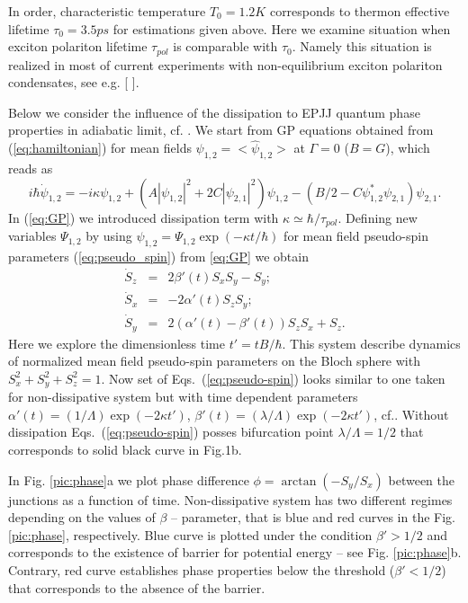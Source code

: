 \documentclass[aps, pre, preprint, groupedaddress, superscriptaddress, showkeys, showpacs] {revtex4-1}
\begin{document}
In order,  characteristic  temperature $T_{0}=1.2K$ corresponds to thermon effective lifetime  $\tau_{0}=3.5ps$ for estimations given above. Here we examine situation when exciton polariton lifetime $\tau_{pol}$ is comparable with $\tau_{0}$. Namely  this situation is realized in most of current experiments with non-equilibrium exciton polariton condensates, see e.g. [   ].  

Below we consider the influence of the dissipation to  EPJJ quantum phase properties in adiabatic limit, cf. \cite{Sols}.
We start from GP equations obtained from  (\ref{eq:hamiltonian}) for mean fields $\psi_{1,2}=<\hat\psi_{1,2}>$  at $\Gamma = 0$ ($B = G$),  which reads as 
\begin{equation}
i \hbar \dot{\psi}_{1,2} = -i \kappa \psi_{1,2} + (A|\psi_{1,2}|^2 + 2C |\psi_{2,1}|^2) \psi_{1,2} - (B/2 - C \psi_{1,2}^* \psi_{2,1}) \psi_{2,1}. 
\label{eq:GP}
\end{equation}
In (\ref{eq:GP}) we introduced dissipation  term with $\kappa \simeq \hbar/\tau_{pol}$.
Defining new variables $\Psi_{1,2}$ by using  $\psi_{1,2} = \Psi_{1,2} \exp(-\kappa t / \hbar)$ for mean field pseudo-spin  parameters (\eqref{eq:pseudo_spin}) from {\ref{eq:GP}} we obtain
%
%
% 
\begin{equation}
\begin{array}{lcl}
\dot{S}_z & = &  2 \beta'(t) S_x S_y - S_y; \\
\dot{S}_x & = & -2 \alpha'(t) S_z S_y; \\
\dot{S}_y & = & 2(\alpha'(t) - \beta'(t)) S_z S_x + S_z.
\end{array}
\label{eq:pseudo-spin}
\end{equation}
%
Here we explore the dimensionless time $t' = t B / \hbar$.
This system describe dynamics of normalized mean field pseudo-spin parameters on the Bloch sphere with $S_x^2 + S_y^2 + S_z^2 = 1$.
Now set of Eqs.\ ({\ref{eq:pseudo-spin}}) looks similar to one taken for non-dissipative system but with time dependent parameters $\alpha'(t) = (1/ \Lambda) \exp(-2 \kappa t')$, $\beta'(t) = (\lambda / \Lambda) \exp(-2 \kappa t')$, cf.\cite{Sedov}. Without dissipation Eqs.\ ({\ref{eq:pseudo-spin}}) posses  bifurcation point $\lambda / \Lambda= 1 / 2$ that corresponds to solid black curve in Fig.1b. 

In Fig. \ref{pic:phase}a we plot phase difference $ \phi = \arctan(-S_y / S_x)$ between the junctions as a function of time.  Non-dissipative system has two different regimes depending on the values of  $\beta$ -- parameter, that is blue and red curves in the Fig. \ref{pic:phase}, respectively. Blue  curve is plotted under the condition $\beta' > 1/2$ and  corresponds to the existence of barrier for potential energy -- see Fig. \ref{pic:phase}b. Contrary,  red curve establishes phase properties below the threshold ($\beta' <1/2$) that corresponds to the absence of the barrier. 
\end{document}

